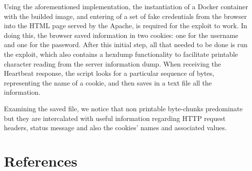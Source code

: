 \documentclass[12pt,a4paper,english,onecolumn]{IEEEtran}
\begin{document}
Using the aforementioned implementation, the instantiation of a Docker container with the builded image, and entering of a set of fake credentials from the browser into the HTML page served by the Apache, is required for the exploit to work. In doing this, the browser saved information in two cookies: one for the username and one for the password. After this initial step, all that needed to be done is run the exploit, which also contains a hexdump functionality to facilitate printable character reading from the server information dump. When receiving the Heartbeat response, the script looks for a particular sequence of bytes, representing the name of a cookie, and then saves in a text file all the information. \par

Examining the saved file, we notice that non printable byte-chunks predominate but they are intercalated with useful information regarding HTTP request headers, status message and also the cookies' names and associated values.

\vspace{10px}
\section{References}
\nocite{*}
\printbibliography[heading=none]
\end{document}
